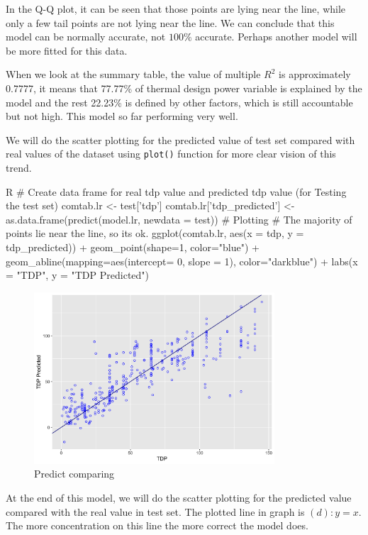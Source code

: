 In the Q-Q plot, it can be seen that those points are lying near the line, while only a few tail points are not lying near the line. We can conclude that this model can be normally accurate, not $100\%$ accurate. Perhaps another model will be more fitted for this data.

When we look at the summary table, the value of multiple $R^2$ is approximately 0.7777, it means that 77.77\% of thermal design power variable is explained by the model and the rest 22.23\% is defined by other factors, which is still accountable but not high. This model so far performing very well.

We will do the scatter plotting for the predicted value of test set compared with real values of the dataset using \verb|plot()| function for more clear vision of this trend.
\begin{code}{R}
# Create data frame for real tdp value and predicted tdp value (for Testing the test set)
comtab.lr <- test['tdp']
comtab.lr['tdp_predicted'] <- as.data.frame(predict(model.lr, newdata = test))
# Plotting
# The majority of points lie near the line, so its ok.
ggplot(comtab.lr, aes(x = tdp, y = tdp_predicted)) +
  geom_point(shape=1, color="blue") +
  geom_abline(mapping=aes(intercept= 0, slope = 1), color="darkblue") +
  labs(x = "TDP", y = "TDP Predicted")
\end{code}
\begin{figure}[H]
    \centering
    \includegraphics[width=0.8\textwidth]{graphics/linear_predict.png}
    \caption{Predict comparing}
    \label{fig:34}
\end{figure}

At the end of this model, we will do the scatter plotting for the predicted value compared with the real value in test set. The plotted line in graph is $(d): y = x$. The more concentration on this line the more correct the model does.

